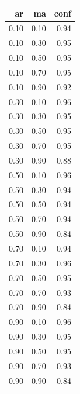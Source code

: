 \begin{table}[ht]
\centering
\begin{tabular}{rrr}
  \hline
ar & ma & conf \\ 
  \hline
0.10 & 0.10 & 0.94 \\ 
  0.10 & 0.30 & 0.95 \\ 
  0.10 & 0.50 & 0.95 \\ 
  0.10 & 0.70 & 0.95 \\ 
  0.10 & 0.90 & 0.92 \\ 
  0.30 & 0.10 & 0.96 \\ 
  0.30 & 0.30 & 0.95 \\ 
  0.30 & 0.50 & 0.95 \\ 
  0.30 & 0.70 & 0.95 \\ 
  0.30 & 0.90 & 0.88 \\ 
  0.50 & 0.10 & 0.96 \\ 
  0.50 & 0.30 & 0.94 \\ 
  0.50 & 0.50 & 0.94 \\ 
  0.50 & 0.70 & 0.94 \\ 
  0.50 & 0.90 & 0.84 \\ 
  0.70 & 0.10 & 0.94 \\ 
  0.70 & 0.30 & 0.96 \\ 
  0.70 & 0.50 & 0.95 \\ 
  0.70 & 0.70 & 0.93 \\ 
  0.70 & 0.90 & 0.84 \\ 
  0.90 & 0.10 & 0.96 \\ 
  0.90 & 0.30 & 0.95 \\ 
  0.90 & 0.50 & 0.95 \\ 
  0.90 & 0.70 & 0.93 \\ 
  0.90 & 0.90 & 0.84 \\ 
   \hline
\end{tabular}
\end{table}
